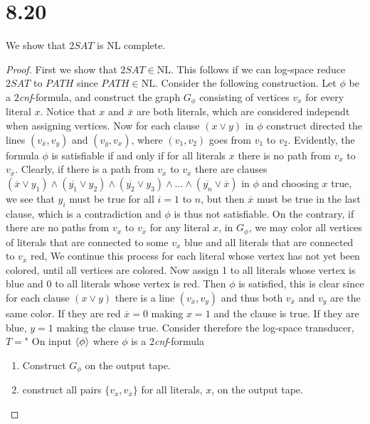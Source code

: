 \documentclass[a4paper,11pt]{article}
\numberwithin{equation}{section}
\begin{document}
	\section*{8.20}
	We show that $ 2SAT $ is NL complete.
	\begin{proof}
			First we show that $ 2SAT\in \text{NL} $. This follows if we can log-space reduce $ 2SAT $ to $ PATH $ since $PATH\in \text{NL}$. Consider the following construction. Let $ \phi $ be a $ 2 $\textit{cnf}-formula, and construct the graph $ G_\phi $ consisting of vertices $ v_x $ for every literal $ x $. Notice that $ x $ and $ \bar{x} $ are both literals, which are considered independt when assigning vertices. Now for each clause $ (x\vee y) $ in $ \phi $ construct directed the lines $ (v_{\overline{x}},v_y) $ and $ (v_{\overline{y}},v_x) $, where $ (v_1,v_2) $ goes from $ v_1 $ to $ v_2 $. Evidently, the formula $ \phi $ is satisfiable if and only if for all literals $ x $ there is no path from $ v_x $ to $ v_{\overline{x}} $. Clearly, if there is a path from $ v_x $ to $ v_{\overline{x}} $ there are clauses $ (\overline{x}\vee y_1)\wedge(\overline{y_1}\vee y_2)\wedge(\overline{y_2}\vee y_3)\wedge...\wedge(\overline{y_n}\vee \overline{x}) $ in $\phi$ and choosing $ x $ true, we see that $ y_i $ must be true for all $ i=1 $ to $ n $, but then $ \overline{x} $ must be true in the last clause, which is a contradiction and $ \phi $ is thus not satisfiable. On the contrary, if there are no paths from $ v_x $ to $ v_{\overline{x}} $ for any literal $ x $, in $ G_\phi $, we may color all vertices of literals that are connected to some $ v_x $ blue and all literals that are connected to $ v_{\overline{x}} $ red, We continue this process for each literal whose vertex has not yet been colored, until all vertices are colored. Now assign 1 to all literals whose vertex is blue and 0 to all literals whose vertex is red. Then $ \phi $ is satisfied, this is clear since for each clause $ (x\vee y) $ there is a line $ (v_{\overline{x}},v_y) $ and thus both $ v_{\overline{x}} $ and $ v_y $ are the same color. If they are red $ \overline{x}=0 $ making $ x=1 $ and the clause is true. If they are blue, $ y=1 $ making the clause true. Consider therefore the log-space transducer, $ T= $" On input $ \braket{\phi} $ where $ \phi $ is a 2\textit{cnf}-formula\begin{enumerate}
				\item Construct $ G_\phi $ on the output tape.
				\item construct all pairs $\{v_x,v_{\overline{x}}\}$ for all literals, $x$, on the output tape.

\end{enumerate}
\end{proof}
\end{document}
